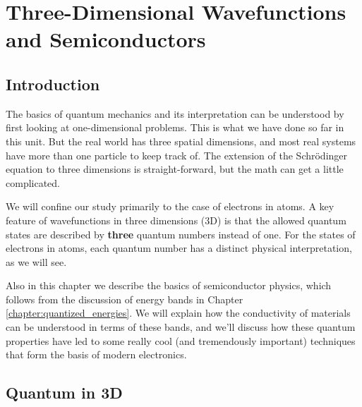 \chapter[3D Wavefunctions and Semiconductors]{Three-Dimensional Wavefunctions and Semiconductors}
\label{chapter:3D_and_semiconductors}

\section{Introduction}
\label{sec:3D_and_semiconductors_intro}

\indent The basics of quantum mechanics and its interpretation can be
understood by first looking at one-dimensional problems.  This is what
we have done so far in this unit.  But the real world has three spatial
dimensions, and most real systems have more than one particle to keep
track of.  The extension of the Schr\"{o}dinger equation to three
dimensions is straight-forward, but the math can get a little
complicated.

We will confine our study primarily to the case of electrons in atoms.  
A key feature of wavefunctions in
three dimensions (3D) is that the allowed quantum states are described by
{\bf three} quantum numbers instead of one.  For the states of
electrons in atoms, each quantum number has a distinct physical
interpretation, as we will see.

Also in this chapter we describe the basics of semiconductor physics,
which follows from the discussion of energy bands in Chapter
\ref{chapter:quantized_energies}. We will explain how the conductivity
of materials can be understood in terms of these bands, and we'll
discuss how these quantum properties have led to some really
cool (and tremendously important) techniques that form the basis
of modern electronics.

\section{Quantum in 3D}
\label{sec:3D_quantum}

